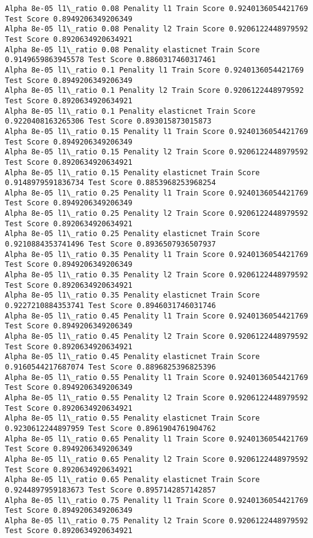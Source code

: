 \documentclass[11pt]{article}
\begin{document}
\begin{Verbatim}[commandchars=\\\{\}]
Alpha 8e-05 l1\_ratio 0.08 Penality l1 Train Score 0.9240136054421769 Test Score 0.8949206349206349
Alpha 8e-05 l1\_ratio 0.08 Penality l2 Train Score 0.9206122448979592 Test Score 0.8920634920634921
Alpha 8e-05 l1\_ratio 0.08 Penality elasticnet Train Score 0.9149659863945578 Test Score 0.8860317460317461
Alpha 8e-05 l1\_ratio 0.1 Penality l1 Train Score 0.9240136054421769 Test Score 0.8949206349206349
Alpha 8e-05 l1\_ratio 0.1 Penality l2 Train Score 0.9206122448979592 Test Score 0.8920634920634921
Alpha 8e-05 l1\_ratio 0.1 Penality elasticnet Train Score 0.9220408163265306 Test Score 0.893015873015873
Alpha 8e-05 l1\_ratio 0.15 Penality l1 Train Score 0.9240136054421769 Test Score 0.8949206349206349
Alpha 8e-05 l1\_ratio 0.15 Penality l2 Train Score 0.9206122448979592 Test Score 0.8920634920634921
Alpha 8e-05 l1\_ratio 0.15 Penality elasticnet Train Score 0.9148979591836734 Test Score 0.8853968253968254
Alpha 8e-05 l1\_ratio 0.25 Penality l1 Train Score 0.9240136054421769 Test Score 0.8949206349206349
Alpha 8e-05 l1\_ratio 0.25 Penality l2 Train Score 0.9206122448979592 Test Score 0.8920634920634921
Alpha 8e-05 l1\_ratio 0.25 Penality elasticnet Train Score 0.9210884353741496 Test Score 0.8936507936507937
Alpha 8e-05 l1\_ratio 0.35 Penality l1 Train Score 0.9240136054421769 Test Score 0.8949206349206349
Alpha 8e-05 l1\_ratio 0.35 Penality l2 Train Score 0.9206122448979592 Test Score 0.8920634920634921
Alpha 8e-05 l1\_ratio 0.35 Penality elasticnet Train Score 0.9227210884353741 Test Score 0.8946031746031746
Alpha 8e-05 l1\_ratio 0.45 Penality l1 Train Score 0.9240136054421769 Test Score 0.8949206349206349
Alpha 8e-05 l1\_ratio 0.45 Penality l2 Train Score 0.9206122448979592 Test Score 0.8920634920634921
Alpha 8e-05 l1\_ratio 0.45 Penality elasticnet Train Score 0.9160544217687074 Test Score 0.8896825396825396
Alpha 8e-05 l1\_ratio 0.55 Penality l1 Train Score 0.9240136054421769 Test Score 0.8949206349206349
Alpha 8e-05 l1\_ratio 0.55 Penality l2 Train Score 0.9206122448979592 Test Score 0.8920634920634921
Alpha 8e-05 l1\_ratio 0.55 Penality elasticnet Train Score 0.9230612244897959 Test Score 0.8961904761904762
Alpha 8e-05 l1\_ratio 0.65 Penality l1 Train Score 0.9240136054421769 Test Score 0.8949206349206349
Alpha 8e-05 l1\_ratio 0.65 Penality l2 Train Score 0.9206122448979592 Test Score 0.8920634920634921
Alpha 8e-05 l1\_ratio 0.65 Penality elasticnet Train Score 0.9244897959183673 Test Score 0.8957142857142857
Alpha 8e-05 l1\_ratio 0.75 Penality l1 Train Score 0.9240136054421769 Test Score 0.8949206349206349
Alpha 8e-05 l1\_ratio 0.75 Penality l2 Train Score 0.9206122448979592 Test Score 0.8920634920634921

\end{Verbatim}
\end{document}
